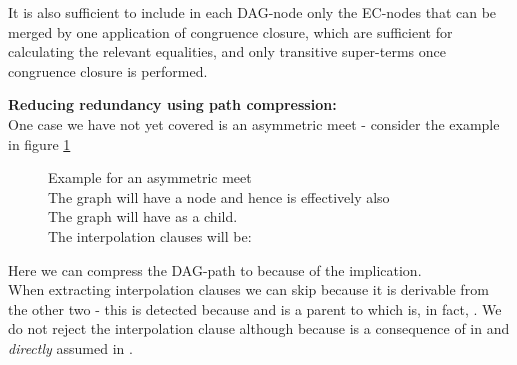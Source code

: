 It is also sufficient to include in each DAG-node only the EC-nodes that can be merged by one application of congruence closure, which are sufficient for calculating the relevant equalities, and only transitive super-terms once congruence closure is performed.

\textbf{Reducing redundancy using path compression:}\\
One case we have not yet covered is an asymmetric meet - consider the example in figure \ref{example_4.2.1.7}
\begin{figure}[H]
\caption{Example for an asymmetric meet\\
The graph  will have a node \m{[b_0,b_1]} and hence is effectively also \\
The graph  will have  as a child.\\
The interpolation clauses will be:\\
}
\label{example_4.2.1.7}
\end{figure}
Here we can compress the DAG-path  to  because of the implication.\\
When extracting interpolation clauses we can skip  because it is derivable from the other two 
- this is detected because  and  is a parent to  which is, in fact, . We do not reject the interpolation clause  although  because \m{[b_0]=[b_1]} is a consequence of \m{[a_0]=[a_1]} in  and \emph{directly} assumed in .

